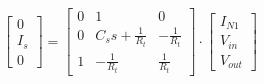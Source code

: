 \begin{equation}
\left[\begin{matrix}0\\I_{s}\\0\end{matrix}\right]=\left[\begin{matrix}0 & 1 & 0\\0 & C_{s} s + \frac{1}{R_{t}} & - \frac{1}{R_{t}}\\1 & - \frac{1}{R_{t}} & \frac{1}{R_{t}}\end{matrix}\right]\cdot \left[\begin{matrix}I_{N1}\\V_{in}\\V_{out}\end{matrix}\right]
\end{equation}

